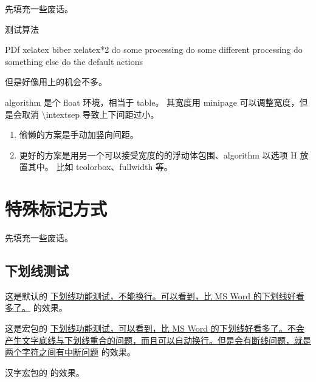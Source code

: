 \documentclass[../Main/thesis]{subfiles}
\begin{document}
先填充一些废话。\zhlipsum[7]

\begin{minipage}{0.75\textwidth}

\begin{algorithm}[H]
  \caption{测试算法}
  \label{alg:test}
    \begin{algorithmic}[1]
      \REQUIRE PDf
      \ENSURE xelatex biber xelatex*2
      \STATE do some processing
      \STATE do some different processing
      \STATE do something else
      \ELSE
      \STATE do the default actions
      \ENDIF
    \end{algorithmic}
  \end{algorithm}

\end{minipage}
\newline

但是好像用上的机会不多。

algorithm 是个 float 环境，相当于 table。
其宽度用 minipage 可以调整宽度，但是会取消 \textbackslash intextsep 导致上下间距过小。

\begin{enumerate}[(1)]
  \item 偷懒的方案是手动加竖向间距。
  \item 更好的方案是用另一个可以接受宽度的的浮动体包围、algorithm 以选项 H 放置其中。
  比如 tcolorbox、fullwidth 等。
\end{enumerate}

\section{特殊标记方式}
\label{sec:mark-methods}

先填充一些废话。\zhlipsum[9]

\subsection{下划线测试}
\label{ssc:underline}

这是默认的 \underline{下划线功能测试，不能换行。可以看到，比 MS Word 的下划线好看多了。} 的效果。

这是宏包的 \uline{下划线功能测试，可以看到，比 MS Word 的下划线好看多了。不会产生文字底线与下划线重合的问题，而且可以自动换行。但是会有断线问题，就是两个字符之间有中断问题} 的效果。

汉字宏包的  的效果。
\end{document}
